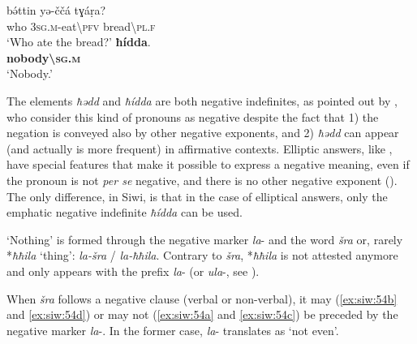 \documentclass[output=paper,colorlinks,citecolor=brown]{langscibook}
\begin{document}
\ea\label{ex:siw:53}
    \begin{xlist}[B: ]
        \gll  bə́ttin yə-ččá tɣáṛa?\\ 
              who \textsc{3sg.m}{}-eat{\textbackslash}\textsc{pfv} bread{\textbackslash}\textsc{pl.f}\\ 
        \glt ‘Who ate the bread?’
        \gll  \textbf{ħídda}.\\ 
              \textbf{nobody{\textbackslash}\textsc{sg.m}} \\
        \glt ‘Nobody.’
    \end{xlist}
\z 


The elements \textit{ħədd} and \textit{ħídda} are both negative indefinites, as pointed out by \citealt{AuweraAlsenoy2016}, who consider this kind of pronouns as negative despite the fact that 1) the negation is conveyed also by other negative exponents, and 2) \textit{ħədd} can appear (and actually is more frequent) in affirmative contexts. Elliptic answers, like , have special features that make it possible to express a negative meaning, even if the pronoun is not \textit{per se} negative, and there is no other negative exponent (\citealt[476--478]{AuweraAlsenoy2016}). The only difference, in Siwi, is that in the case of elliptical answers, only the emphatic negative indefinite \textit{ħídda} can be used.

‘Nothing’ is formed through the negative marker \textit{la}{}- and the word \textit{šra} or, rarely *\textit{ħħila} ‘thing’: \textit{la-šra} / \textit{la-ħħila}. Contrary to \textit{šra}, *\textit{ħħila} is not attested anymore and only appears with the prefix \textit{la}{}- (or \textit{ula}{}-, see ). 

When \textit{šra} follows a negative clause (verbal or non-verbal), it may (\ref{ex:siw:54b} and \ref{ex:siw:54d}) or may not (\ref{ex:siw:54a} and \ref{ex:siw:54c}) be preceded by the negative marker \textit{la}{}-. In the former case, \textit{la}{}- translates as ‘not even’.
\end{document}
